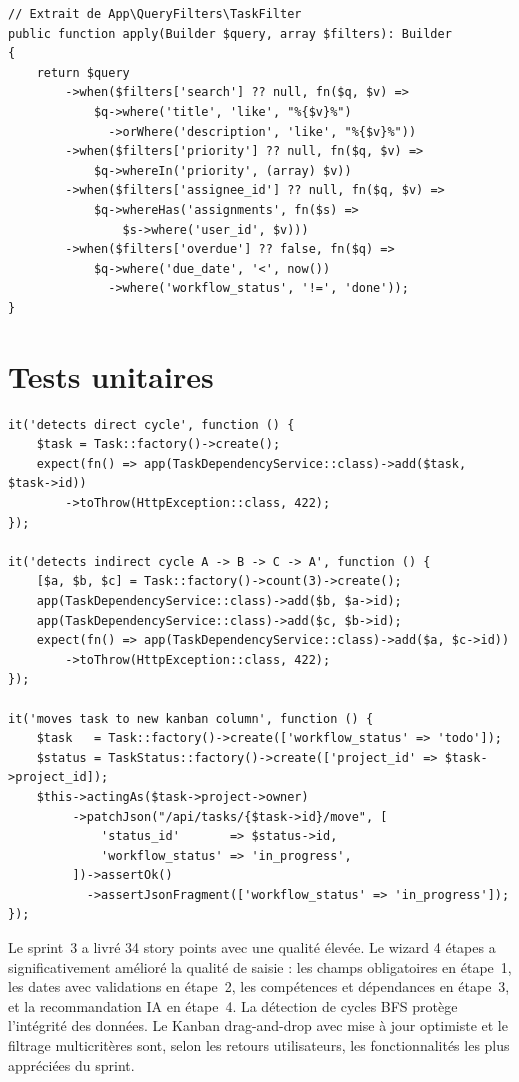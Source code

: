 \begin{lstlisting}[style=phpstyle,caption={Scope de filtrage des tâches — TaskFilter},
  label={lst:task_filter}]
// Extrait de App\QueryFilters\TaskFilter
public function apply(Builder $query, array $filters): Builder
{
    return $query
        ->when($filters['search'] ?? null, fn($q, $v) =>
            $q->where('title', 'like', "%{$v}%")
              ->orWhere('description', 'like', "%{$v}%"))
        ->when($filters['priority'] ?? null, fn($q, $v) =>
            $q->whereIn('priority', (array) $v))
        ->when($filters['assignee_id'] ?? null, fn($q, $v) =>
            $q->whereHas('assignments', fn($s) =>
                $s->where('user_id', $v)))
        ->when($filters['overdue'] ?? false, fn($q) =>
            $q->where('due_date', '<', now())
              ->where('workflow_status', '!=', 'done'));
}
\end{lstlisting}

\section{Tests unitaires}

\begin{lstlisting}[style=phpstyle,caption={Tests unitaires — Dépendances et Kanban},label={lst:tests_s3}]
it('detects direct cycle', function () {
    $task = Task::factory()->create();
    expect(fn() => app(TaskDependencyService::class)->add($task, $task->id))
        ->toThrow(HttpException::class, 422);
});

it('detects indirect cycle A -> B -> C -> A', function () {
    [$a, $b, $c] = Task::factory()->count(3)->create();
    app(TaskDependencyService::class)->add($b, $a->id);
    app(TaskDependencyService::class)->add($c, $b->id);
    expect(fn() => app(TaskDependencyService::class)->add($a, $c->id))
        ->toThrow(HttpException::class, 422);
});

it('moves task to new kanban column', function () {
    $task   = Task::factory()->create(['workflow_status' => 'todo']);
    $status = TaskStatus::factory()->create(['project_id' => $task->project_id]);
    $this->actingAs($task->project->owner)
         ->patchJson("/api/tasks/{$task->id}/move", [
             'status_id'       => $status->id,
             'workflow_status' => 'in_progress',
         ])->assertOk()
           ->assertJsonFragment(['workflow_status' => 'in_progress']);
});
\end{lstlisting}

\begin{chapconclusion}
Le sprint~3 a livré 34 story points avec une qualité élevée. Le wizard 4 étapes a
significativement amélioré la qualité de saisie : les champs obligatoires en étape~1,
les dates avec validations en étape~2, les compétences et dépendances en étape~3, et
la recommandation IA en étape~4. La détection de cycles BFS protège l'intégrité des
données. Le Kanban drag-and-drop avec mise à jour optimiste et le filtrage multicritères
sont, selon les retours utilisateurs, les fonctionnalités les plus appréciées du sprint.
\end{chapconclusion}
